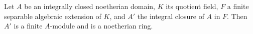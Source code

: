 Let $A$ be an integrally closed noetherian domain, $K$ its quotient field, $F$ a finite separable algebraic extension of $K$, and $A'$ the integral closure of $A$ in $F$. Then $A'$ is a finite $A$-module and is a noetherian ring.
